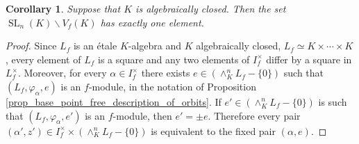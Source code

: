 \documentclass{article} %
\newtheorem{corollary}[proposition]{Corollary}
\numberwithin{equation}{section}
\DeclareMathOperator{\SL}{SL}
\begin{document}
\begin{corollary}\label{cor_unique_geometric_orbit}
    Suppose that $K$ is algebraically closed. Then the set $\SL_n(K) \backslash V_f(K)$ has exactly one element.
\end{corollary}
\begin{proof}
    Since $L_f$ is an \'etale $K$-algebra and $K$ algebraically closed, $L_f\simeq K \times \cdots \times K$, every element of $L_f$ is a square and any two elements of $I_f^{\times}$ differ by a square in $L_f^{\times}$.
    Moreover, for every $\alpha \in I_f^{\times}$ there exists $e\in (\wedge^n_K L_f - \{ 0 \})$ such that $(L_f, \varphi_{\alpha}, e)$ is an $f$-module, in the notation of Proposition \ref{prop_base_point_free_description_of_orbits}.
    If $e'\in (\wedge^n_K L_f - \{ 0 \})$ is such that $(L_f, \varphi_{\alpha}, e')$ is an $f$-module, then $e' = \pm e$.
    Therefore every pair $(\alpha',z') \in I_f^\times \times (\wedge^n_K L_f - \{ 0 \})$ is equivalent to the fixed pair $(\alpha, e)$.
\end{proof}
\end{document}
